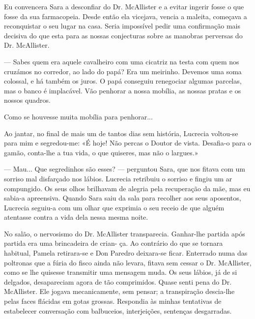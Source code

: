 Eu convencera Sara a desconfiar do Dr. McAllister e a evitar ingerir
fosse o que fosse da sua farmacopeia. Desde então ela vicejava, vencia a
maleita, começava a reconquistar o seu lugar na casa. Seria impossível
pedir uma confirmação mais decisiva do que esta para as nossas
conjecturas sobre as manobras perversas do Dr. McAllister.

--- Sabes quem era aquele cavalheiro com uma cicatriz na testa com quem
  nos cruzámos no corredor, ao lado do papá? Era um meirinho. Devemos
  uma soma colossal, e há também os juros. O papá conseguiu renegociar
  algumas parcelas, mas o banco é implacável. Vão penhorar a nossa
  mobília, as nossas pratas e os nossos quadros.

Como se houvesse muita mobília para penhorar...

Ao jantar, no final de mais um de tantos dias sem história, Lucrecia
voltou-se para mim e segredou-me: «É hoje! Não percas o Doutor de
vista. Desafia-o para o gamão, conta-lhe a tua vida, o que quiseres, mas
não o largues.»

--- Mau... Que segredinhos são esses? --- perguntou Sara, que nos fitava
  com um sorriso mal disfarçado nos lábios. Lucrecia retribuiu o
  sorriso e fingiu um ar compungido. Os seus olhos brilhavam de alegria
  pela recuperação da mãe, mas eu sabia-a apreensiva. Quando Sara saiu
  da sala para recolher aos seus aposentos, Lucrecia seguiu-a com um
  olhar que exprimia o seu receio de que alguém atentasse contra a vida
  dela nessa mesma noite.

No salão, o nervosismo do Dr. McAllister transparecia. Ganhar-lhe
partida após partida era uma brincadeira de crian- ça. Ao contrário do
que se tornara habitual, Pamela retirara-se e Don Paredro deixara-se
ficar. Enterrado numa das poltronas que a fúria do fisco ainda não
levara, fitava sem cessar o Dr. McAllister, como se lhe quisesse
transmitir uma mensagem
muda. Os seus lábios, já de si delgados, desapareciam agora de tão
comprimidos. Quase senti pena do Dr. McAllister. Ele jogava
mecanicamente, sem pensar; a transpiração descia-lhe pelas faces
flácidas em gotas grossas. Respondia às minhas tentativas de estabelecer
conversação com balbuceios, interjeições, sentenças desgarradas.

